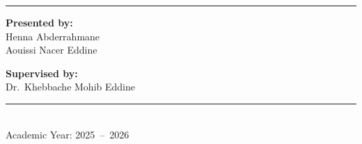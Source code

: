 \begin{titlepage}
\vspace{0.7cm}
\rule{\linewidth}{0.6pt}
\vspace{0.5cm}

\begin{minipage}[t]{0.48\textwidth}
\raggedright
\textbf{Presented by:}\\[4pt]
Henna Abderrahmane\\
Aouissi Nacer Eddine
\end{minipage}
\hfill
\begin{minipage}[t]{0.48\textwidth}
\raggedleft
\textbf{Supervised by:}\\[4pt]
Dr.\ Khebbache Mohib Eddine
\end{minipage}

\vspace{0.6cm}


\vfill

\rule{0.5\linewidth}{0.4pt}\\[4pt]
{\normalsize Academic Year: 2025~--~2026}

\end{titlepage}

